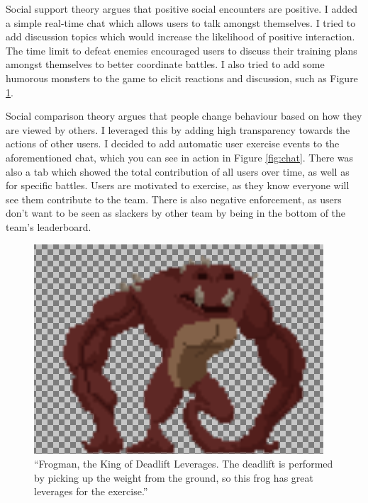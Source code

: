\documentclass{l4proj}
\begin{document}
Social support theory argues that positive social encounters are positive. I added a simple real-time chat which allows users to talk amongst themselves. I tried to add discussion topics which would increase the likelihood of positive interaction. The time limit to defeat enemies encouraged users to discuss their training plans amongst themselves to better coordinate battles. I also tried to add some humorous monsters to the game to elicit reactions and discussion, such as Figure \ref{fig:frogman}. 

Social comparison theory argues that people change behaviour based on how they are viewed by others. I leveraged this by adding high transparency towards the actions of other users. I decided to add automatic user exercise events to the aforementioned chat, which you can see in action in Figure \ref{fig:chat}. There was also a tab which showed the total contribution of all users over time, as well as for specific battles. Users are motivated to exercise, as they know everyone will see them contribute to the team. There is also negative enforcement, as users don't want to be seen as slackers by other team by being in the bottom of the team's leaderboard. 

\begin{figure}[H]
    \centering
    \includegraphics[width=0.4\linewidth]{froggie.png}    
    \caption{
      ``Frogman, the King of Deadlift Leverages. The deadlift is performed by picking up the weight from the ground, so this frog has great leverages for the exercise.''
    }
    \label{fig:frogman} 
\end{figure}
\end{document}
